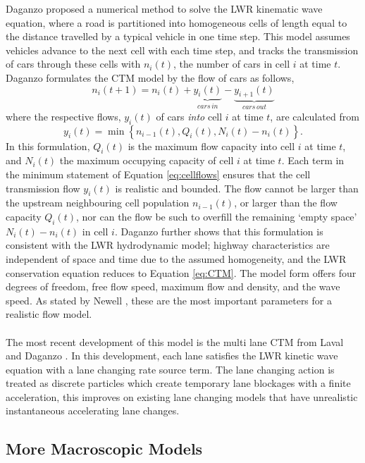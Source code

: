 	Daganzo proposed a numerical method to solve the LWR kinematic wave equation, where a road is partitioned into homogeneous cells of length equal to the distance travelled by a typical vehicle in one time step. This model assumes vehicles advance to the next cell with each time step, and tracks the transmission of cars through these cells with $n_i(t)$, the number of cars in cell $i$ at time $t$. Daganzo formulates the CTM model \cite{Daganzo94} by the flow of cars as follows,
	\begin{equation}
		n_i(t+1)=n_i(t)+\underbrace{y_i(t)}_{cars\,in}-\underbrace{y_{i+1}(t)}_{cars\,out}\label{eq:CTM}
	\end{equation}
	where the respective flows, $y_i(t)$ of cars \emph{into} cell $i$ at time $t$, are calculated from
	\begin{equation}
		y_i(t)=\min\left\{n_{i-1}(t),Q_i(t),N_i(t)-n_i(t)\right\}. \label{eq:cellflows}
	\end{equation} 
	In this formulation, $Q_i(t)$ is the maximum flow capacity into cell $i$ at time $t$, and $N_i(t)$ the maximum occupying capacity of cell $i$ at time $t$. Each term in the minimum statement of Equation \ref{eq:cellflows} ensures that the cell transmission flow $y_i(t)$ is realistic and bounded. The flow cannot be larger than the upstream neighbouring cell population $n_{i-1}(t)$, or larger than the flow capacity $Q_i(t)$, nor can the flow be such to overfill the remaining `empty space' $N_i(t)-n_i(t)$ in cell $i$. Daganzo further shows that this formulation is consistent with the LWR hydrodynamic model; highway characteristics are independent of space and time due to the assumed homogeneity, and the LWR conservation equation reduces to Equation \ref{eq:CTM}. The model form offers four degrees of freedom, free flow speed, maximum flow and density, and the wave speed. As stated by Newell \cite{Newell95}, these are the most important parameters for a realistic flow model. \\ \\ 
	The most recent development of this model is the multi lane CTM from Laval and Daganzo \cite{Laval06}. In this development, each lane satisfies the LWR kinetic wave equation with a lane changing rate source term. The lane changing action is treated as discrete particles which create temporary lane blockages with a finite acceleration, this improves on existing lane changing models that have unrealistic instantaneous accelerating lane changes.

\subsection{More Macroscopic Models}


